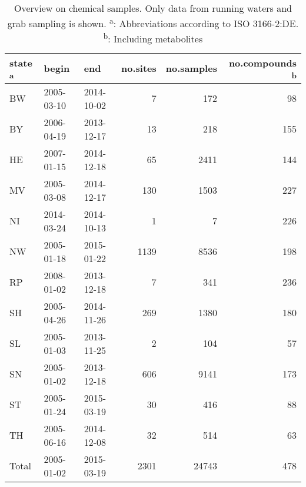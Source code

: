 \begin{table}[ht]
\centering
\caption[Overview on chemical samples.]{Overview on chemical samples. Only data from running waters and grab
sampling is shown. \textsuperscript{a}: Abbreviations according to ISO 3166-2:DE. 
      \textsuperscript{b}: Including metabolites} 
\label{tab:phch_overview}
\begin{tabular}{lllrrr}
  \toprule
state \textsuperscript{a} & begin & end & no.sites & no.samples & no.compounds \textsuperscript{b} \\ 
  \midrule
BW & 2005-03-10 & 2014-10-02 & 7 & 172 & 98 \\ 
  BY & 2006-04-19 & 2013-12-17 & 13 & 218 & 155 \\ 
  HE & 2007-01-15 & 2014-12-18 & 65 & 2411 & 144 \\ 
  MV & 2005-03-08 & 2014-12-17 & 130 & 1503 & 227 \\ 
  NI & 2014-03-24 & 2014-10-13 & 1 & 7 & 226 \\ 
  NW & 2005-01-18 & 2015-01-22 & 1139 & 8536 & 198 \\ 
  RP & 2008-01-02 & 2013-12-18 & 7 & 341 & 236 \\ 
  SH & 2005-04-26 & 2014-11-26 & 269 & 1380 & 180 \\ 
  SL & 2005-01-03 & 2013-11-25 & 2 & 104 & 57 \\ 
  SN & 2005-01-02 & 2013-12-18 & 606 & 9141 & 173 \\ 
  ST & 2005-01-24 & 2015-03-19 & 30 & 416 & 88 \\ 
  TH & 2005-06-16 & 2014-12-08 & 32 & 514 & 63 \\ 
   \midrule
Total & 2005-01-02 & 2015-03-19 & 2301 & 24743 & 478 \\ 
   \bottomrule
\end{tabular}
\end{table}
